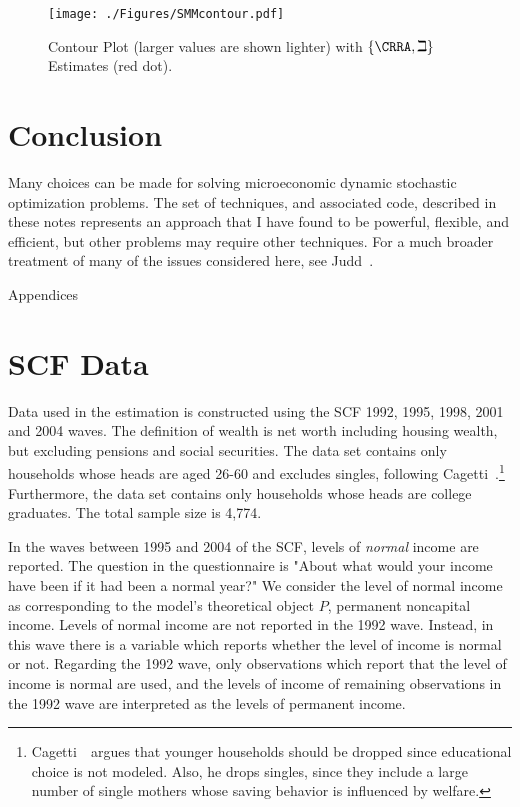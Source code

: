 \documentclass[titlepage, headings=optiontotocandhead]{econtex}
\begin{document}
\hypertarget{PlotContourMedianStrEst}{}
\begin{figure}
  \texttt{[image: ./Figures/SMMcontour.pdf]}
  \caption{Contour Plot (larger values are shown lighter) with $\{\CRRA,\beth\}$ Estimates (red dot).}
  \label{fig:PlotContourMedianStrEst}
\end{figure}


\hypertarget{conclusion}{}
\section{Conclusion}

Many choices can be made for solving microeconomic dynamic stochastic optimization problems.  The set of techniques, and associated code, described in these notes represents an approach that I have found to be powerful, flexible, and efficient, but other problems may require other techniques.  For a much broader treatment of many of the issues considered here, see Judd~\citeyearpar{judd:book}.



\clearpage\vfill\eject

\centerline{\LARGE Appendices}\vspace{0.2in}

\appendix


\hypertarget{scf-data}{}
\section{SCF Data}\label{app:scf-data}

Data used in the estimation is constructed using the SCF 1992, 1995, 1998, 2001 and 2004 waves. The definition of wealth is net worth including housing wealth, but excluding pensions and social securities. The data set contains only households whose heads are aged 26-60 and excludes singles, following Cagetti~\citeyearpar{cagettiWprofiles}.\footnote{Cagetti~\citeyearpar{cagettiWprofiles}\ argues that younger households should be dropped since educational choice is not modeled. Also, he drops singles, since they include a large number of single mothers whose saving behavior is influenced by welfare.} Furthermore, the data set contains only households whose heads are college graduates. The total sample size is 4,774.

In the waves between 1995 and 2004 of the SCF, levels of \textit{normal} income are reported. The question in the questionnaire is "About what would your income have been if it had been a normal year?" We consider the level of normal income as corresponding to the model's theoretical object $P$, permanent noncapital income. Levels of normal income are not reported in the 1992 wave. Instead, in this wave there is a variable which reports whether the level of income is normal or not. Regarding the 1992 wave, only observations which report that the level of income is normal are used, and the levels of income of remaining observations in the 1992 wave are interpreted as the levels of permanent income.
\end{document}
